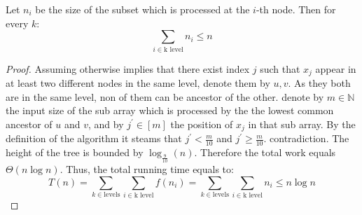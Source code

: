 \begin{example}
\begin{claim}
Let \(n_i\) be the size of the subset which is processed at the \(i\)-th node. Then for every \(k\):
\begin{equation*}
    \sum_{i \in \text{k level}}{n_i} \le n
\end{equation*}
\end{claim}
\begin{proof} Assuming otherwise implies that there exist index \(j\) such that \(x_j\) appear in at least two different nodes in the same level, denote them by \(u,v\). As they both are in the same level, non of them can be ancestor of the other. denote by \(m \in \mathbb{N}\) the input size of the sub array which is processed by the the lowest common ancestor of \(u\) and \(v\), and by \(j^\prime \in [m]\) the position of \(x_j\) in that sub array. By the definition of the algorithm it steams that \(j^\prime < \frac{m}{10} \) and \(j^\prime \ge \frac{m}{10}\). contradiction.  The height of the tree is bounded by \( \log_{\frac{9}{10}} \left(n\right) \). Therefore the total work equals \( \Theta \left( n\log n \right) \). Thus, the total running time equals to:
\begin{equation*}
    T(n) = \sum_{k \in \text{levels}}{\sum_{i \in \text{k level}}{f\left(n_i\right)}} = \sum_{k \in \text{levels}}{\sum_{i \in \text{k level}}{n_i}} \le n\log n  
\end{equation*}
\end{proof}
\end{example}

